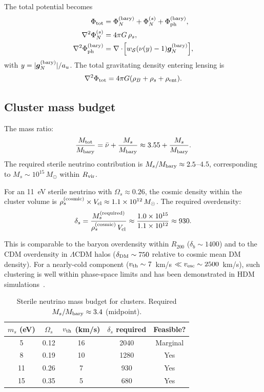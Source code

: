\documentclass[aps,prd,twocolumn,superscriptaddress,nofootinbib]{revtex4-2}
\newcommand{\au}{a_u}
\newcommand{\gN}{\bm{g}_N}
\newcommand{\Ph}{\Phi_{\rm ph}}
\newcommand{\PN}{\Phi_{N}}
\newcommand{\rhob}{\rho_B}
\newcommand{\rhoent}{\rho_{\rm ent}}
\newcommand{\wS}{w_{\mathcal{S}}}
\begin{document}
The total potential becomes
\begin{align}
\Phi_{\rm tot}&=\PN^{(\rm bary)}+\PN^{(s)}+\Ph^{(\rm bary)},\label{eq:totpot}\\
\nabla^2\PN^{(s)}&=4\pi G\,\rho_s,\nonumber\\
\nabla^2\Ph^{(\rm bary)}&=\nabla\cdot\!\Big[\wS(\nu(y)-1)\gN^{(\rm bary)}\Big],\nonumber
\end{align}
with $y=|\gN^{(\rm bary)}|/\au$. The total gravitating density entering lensing is
\begin{equation}
\nabla^2\Phi_{\rm tot}=4\pi G(\rhob+\rho_s+\rhoent).
\label{eq:total_poisson}
\end{equation}

\subsection{Cluster mass budget}

The mass ratio:
\begin{equation}
\frac{M_{\rm tot}}{M_{\rm bary}}=\bar{\nu}+\frac{M_s}{M_{\rm bary}}\approx 3.55+\frac{M_s}{M_{\rm bary}}.
\label{eq:budget}
\end{equation}
The required sterile neutrino contribution is $M_s/M_{\rm bary}\approx 2.5$--$4.5$, corresponding to $M_s\sim 10^{15}\,M_\odot$ within $R_{\rm vir}$.

For an 11~eV sterile neutrino with $\Omega_s\approx 0.26$, the cosmic density within the cluster volume is $\rho_s^{\rm (cosmic)}\times V_{\rm cl}\approx 1.1\times 10^{12}\,M_\odot$. The required overdensity:
\begin{equation}
\delta_s = \frac{M_s^{\rm (required)}}{\rho_s^{\rm (cosmic)}\,V_{\rm cl}} \approx \frac{1.0\times 10^{15}}{1.1\times 10^{12}} \approx 930.
\label{eq:deltas}
\end{equation}

This is comparable to the baryon overdensity within $R_{200}$ ($\delta_b\sim 1400$) and to the CDM overdensity in $\Lambda$CDM halos ($\delta_{\rm DM}\sim 750$ relative to cosmic mean DM density). For a nearly-cold component ($v_{\rm th}\sim 7$~km/s $\ll v_{\rm esc}\sim 2500$~km/s), such clustering is well within phase-space limits and has been demonstrated in HDM simulations~\cite{Haslbauer2020}.

\begin{table}[h]
\caption{Sterile neutrino mass budget for clusters. Required $M_s/M_{\rm bary}\approx 3.4$ (midpoint).}
\label{tab:numass}
\begin{ruledtabular}
\begin{tabular}{ccccc}
$m_s$ (eV) & $\Omega_s$ & $v_{\rm th}$ (km/s) & $\delta_s$ required & Feasible? \\
\hline
5 & 0.12 & 16 & 2040 & Marginal \\
8 & 0.19 & 10 & 1280 & Yes \\
11 & 0.26 & 7 & 930 & Yes \\
15 & 0.35 & 5 & 680 & Yes \\
\end{tabular}
\end{ruledtabular}
\end{table}
\end{document}
